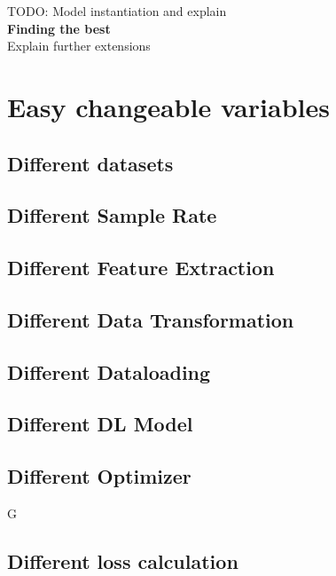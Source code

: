 TODO: Model instantiation and explain \\

{\large \textbf{Finding the best }}\\







Explain further extensions



\section{Easy changeable variables}

\subsection{Different datasets}

\subsection{Different Sample Rate}

\subsection{Different Feature Extraction}

\subsection{Different Data Transformation}

\subsection{Different Dataloading}

\subsection{Different DL Model}

\subsection{Different Optimizer}G

\subsection{Different loss calculation}

